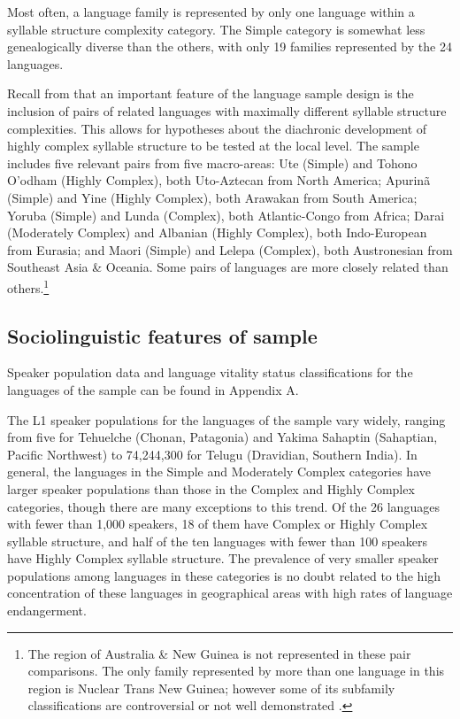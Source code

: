  Most often, a language family is represented by only one language within a syllable structure complexity category. The Simple category is somewhat less genealogically diverse than the others, with only 19 families represented by the 24 languages.

  Recall from  that an important feature of the language sample design is the inclusion of pairs of related languages with maximally different syllable structure complexities. This allows for hypotheses about the diachronic development of highly complex syllable structure to be tested at the local level. The sample includes five relevant pairs from five macro-areas: Ute (Simple) and Tohono O’odham (Highly Complex), both Uto-Aztecan from North America; Apurinã (Simple) and Yine (Highly Complex), both Arawakan from South America; Yoruba (Simple) and Lunda (Complex), both Atlantic-Congo from Africa; Darai (Moderately Complex) and Albanian (Highly Complex), both Indo-European from Eurasia; and Maori (Simple) and Lelepa (Complex), both Austronesian from Southeast Asia \& Oceania. Some pairs of languages are more closely related than others.\footnote{{The region of Australia \& New Guinea is not represented in these pair comparisons. The only family represented by more than one language in this region is Nuclear Trans New Guinea; however some of its subfamily classifications are controversial or not well demonstrated \citep{Pawley2005}.}}

\subsection{Sociolinguistic features of sample}\label{sec:2.4.3}

  Speaker population data and language vitality status classifications for the languages of the sample can be found in Appendix A.

  The L1 speaker populations for the languages of the sample vary widely, ranging from five for Tehuelche (Chonan, Patagonia) and Yakima Sahaptin (Sahaptian, Pacific Northwest) to 74,244,300 for Telugu (Dravidian, Southern India). In general, the languages in the Simple and Moderately Complex categories have larger speaker populations than those in the Complex and Highly Complex categories, though there are many exceptions to this trend. Of the 26 languages with fewer than 1,000 speakers, 18 of them have Complex or Highly Complex syllable structure, and half of the ten languages with fewer than 100 speakers have Highly Complex syllable structure. The prevalence of very smaller speaker populations among languages in these categories is no doubt related to the high concentration of these languages in geographical areas with high rates of language endangerment.

